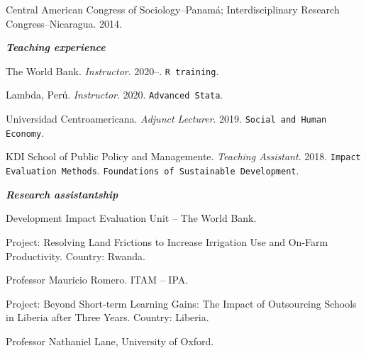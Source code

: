 \documentclass[11pt,article,oneside, a4paper]{memoir}
\begin{document}
\ind Central American Congress of Sociology–Panamá; Interdisciplinary Research Congress–Nicaragua. 2014. 

\bigskip



\noindent\emph{\textbf{Teaching experience} \vspace{0.05in}}

\ind The World Bank. \emph{Instructor}. 2020--. \newline \texttt{R training}.

\ind Lambda, Perú. \emph{Instructor}. 2020. \newline \texttt{Advanced Stata}. 

\ind Universidad Centroamericana. \emph{Adjunct Lecturer}. 2019. \newline \texttt{Social and Human Economy}.  

\ind KDI School of Public Policy and Managemente. \emph{Teaching Assistant}. 2018.  \newline \texttt{Impact Evaluation Methods}. \newline \texttt{Foundations of Sustainable Development}. 

\medskip
\noindent\emph{\textbf{Research assistantship} \vspace{0.05in}}

\ind Development Impact Evaluation Unit -- The World Bank. 

\ind \hspace{0.35in} \footnotesize Project: Resolving Land Frictions to Increase Irrigation Use and On-Farm Productivity. \newline Country: Rwanda. \normalsize \vspace{0.01in}

\ind Professor Mauricio Romero. ITAM -- IPA.

\ind \hspace{0.35in} \footnotesize Project: Beyond Short-term Learning Gains: The Impact of Outsourcing Schools in Liberia after
Three Years. \newline Country: Liberia. \normalsize \vspace{0.01in}

\ind Professor Nathaniel Lane, University of Oxford.
\end{document}
